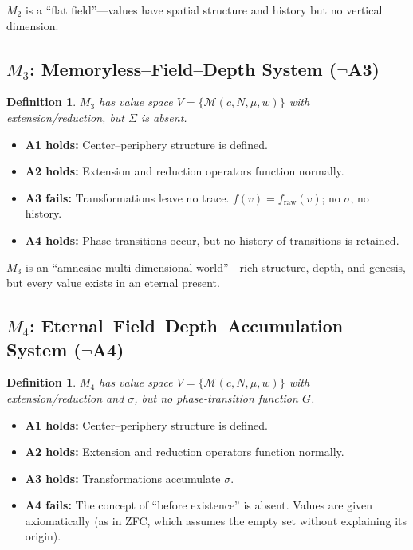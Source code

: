 \documentclass[11pt,a4paper]{article}
\newtheorem{definition}[theorem]{Definition}
\newcommand{\MDim}{\mathcal{M}}
\newcommand{\Sig}{\Sigma}
\begin{document}
$M_2$ is a ``flat field''---values have spatial structure and history but no vertical dimension.

\subsection{$M_3$: Memoryless--Field--Depth System ($\neg$A3)}

\begin{definition}
$M_3$ has value space $V = \{\MDim(c, N, \mu, w)\}$ with extension/reduction, but $\Sig$ is absent.
\end{definition}

\begin{itemize}[leftmargin=*]
  \item \textbf{A1 holds:} Center--periphery structure is defined.
  \item \textbf{A2 holds:} Extension and reduction operators function normally.
  \item \textbf{A3 fails:} Transformations leave no trace. $f(v) = f_{\mathrm{raw}}(v)$; no $\sigma$, no history.
  \item \textbf{A4 holds:} Phase transitions occur, but no history of transitions is retained.
\end{itemize}

$M_3$ is an ``amnesiac multi-dimensional world''---rich structure, depth, and genesis, but every value exists in an eternal present.

\subsection{$M_4$: Eternal--Field--Depth--Accumulation System ($\neg$A4)}

\begin{definition}
$M_4$ has value space $V = \{\MDim(c, N, \mu, w)\}$ with extension/reduction and $\sigma$, but no phase-transition function $G$.
\end{definition}

\begin{itemize}[leftmargin=*]
  \item \textbf{A1 holds:} Center--periphery structure is defined.
  \item \textbf{A2 holds:} Extension and reduction operators function normally.
  \item \textbf{A3 holds:} Transformations accumulate $\sigma$.
  \item \textbf{A4 fails:} The concept of ``before existence'' is absent. Values are given axiomatically (as in ZFC, which assumes the empty set without explaining its origin).
\end{itemize}
\end{document}
